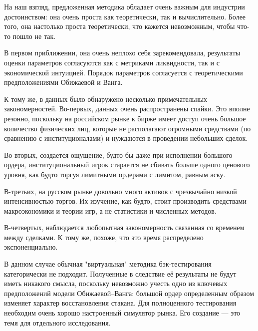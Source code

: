 \conclusion %


На наш взгляд, предложенная методика обладает очень важным для индустрии достоинством: 
она очень проста как теоретически, так и вычислительно. Более того, она настолько проста теоретически,
что кажется невозможным, чтобы что-то пошло не так.
\par
В первом приближении, она очень неплохо себя зарекомендовала, результаты оценки параметров согласуются
как с метриками ликвидности, так и с экономической интуицией. Порядок параметров согласуется с теоретическими
предположениями Обижаевой и Ванга.
\par
К тому же, в данных было обнаружено несколько примечательных закономерностей.
Во-первых, данных очень распространены спайки. Это вполне резонно, поскольку на российском рынке к бирже имеет доступ
очень большое количество физических лиц, которые не располагают огромными средствами (по сравнению с институционалами)
и нуждаются в проведении небольших сделок.
\par
Во-вторых, создается ощущение, будто бы даже при исполнении большого ордера, институциональный игрок старается не сбивать
больше одного ценового уровня, как будто торгуя лимитными ордерами с лимитом, равным аску.
\par
В-третьих, на русском рынке довольно много активов с чрезвычайно низкой интенсивностью торгов. Их изучение, как будто,
стоит производить средствами макроэкономики и теории игр, а не статистики и численных методов.
\par
В-четвертых, наблюдается любопытная закономерность связанная со временем между сделками. К тому же, похоже, что
это время распределено экспоненциально.
\par
В данном случае обычная "виртуальная" методика бэк-тестирования категорически не подходит. Полученные в следствие её результаты
не будут иметь никакого смысла, поскольку невозможно учесть одно из ключевых предположений модели Обижаевой--Ванга:
большой ордер определенным образом изменяет характер восстановления стакана. Для полноценного тестирования необходим 
очень хорошо настроенный симулятор рынка. Его создание --- это темя для отдельного исследования.